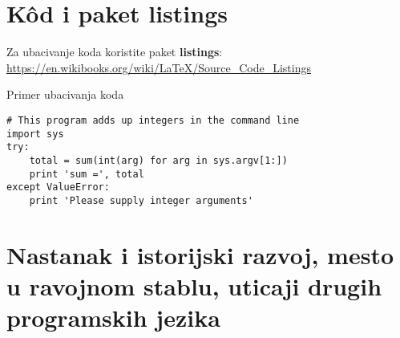\documentclass[a4paper]{article}
\begin{document}
\section{K\^{o}d i paket listings}
Za ubacivanje koda koristite paket \textbf{listings}:
\url{https://en.wikibooks.org/wiki/LaTeX/Source_Code_Listings}

Primer ubacivanja koda
\begin{lstlisting}[frame=single]
# This program adds up integers in the command line
import sys
try:
    total = sum(int(arg) for arg in sys.argv[1:])
    print 'sum =', total
except ValueError:
    print 'Please supply integer arguments'
\end{lstlisting}


\section{Nastanak i istorijski razvoj, mesto u ravojnom stablu, uticaji drugih programskih jezika}
\label{sec:osnovno}
\end{document}
